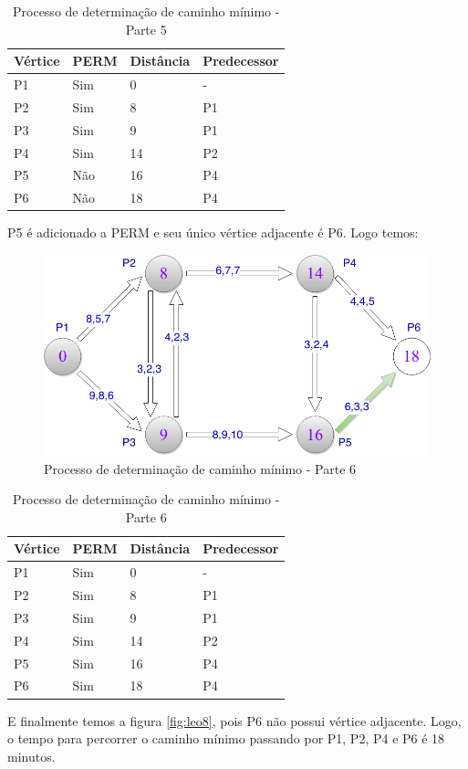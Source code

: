 \begin{table}[htbp]
	\centering
	\begin{tabular}{l l l l}
	\toprule
	Vértice & PERM & Distância & Predecessor\\
	\midrule
	P1 & Sim & 0 & - \\
	P2 & Sim & 8 & P1 \\
	P3 & Sim & 9 & P1 \\
	P4 & Sim & 14 & P2 \\
	P5 & Não & 16 & P4 \\
	P6 & Não & 18 & P4 \\
	\bottomrule
	\end{tabular}
\caption{Processo de determinação de caminho mínimo - Parte 5}
 \label{tab:leotab5}
\end{table}

P5 é adicionado a PERM e seu único vértice adjacente é P6. Logo temos:
\FloatBarrier
\begin{figure}[htbp]
\centering
 \includegraphics[width=.50\textwidth]{chapters/fig/leo7.png}
\caption{Processo de determinação de caminho mínimo - Parte 6}
\label{fig:leo7}
\end{figure}

\begin{table}[htbp]
	\centering
	\begin{tabular}{l l l l}
	\toprule
	Vértice & PERM & Distância & Predecessor\\
	\midrule
	P1 & Sim & 0 & - \\
	P2 & Sim & 8 & P1 \\
	P3 & Sim & 9 & P1 \\
	P4 & Sim & 14 & P2 \\
	P5 & Sim & 16 & P4 \\
	P6 & Sim & 18 & P4 \\
	\bottomrule
	\end{tabular}
\caption{Processo de determinação de caminho mínimo - Parte 6}
 \label{tab:leotab5}
\end{table}
\FloatBarrier

E finalmente temos a figura \ref{fig:leo8}, pois P6 não possui vértice adjacente. Logo, o 
tempo para percorrer o caminho mínimo passando por P1, P2, P4 e P6 é 18 minutos.

